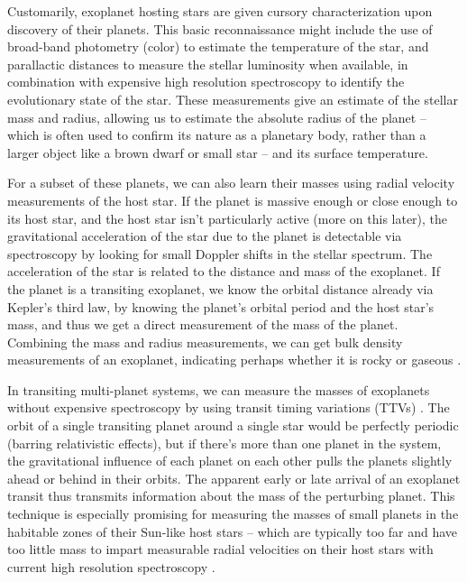 Customarily, exoplanet hosting stars are given cursory characterization upon discovery of their planets. This basic reconnaissance might include the use of broad-band photometry (color) to estimate the temperature of the star, and parallactic distances to measure the stellar luminosity when available, in combination with expensive high resolution spectroscopy to identify the evolutionary state of the star. These measurements give an estimate of the stellar mass and radius, allowing us to estimate the absolute radius of the planet -- which is often used to confirm its nature as a planetary body, rather than a larger object like a brown dwarf or small star -- and its surface temperature. 

For a subset of these planets, we can also learn their masses using radial velocity measurements of the host star. If the planet is massive enough or close enough to its host star, and the host star isn't particularly active (more on this later), the gravitational acceleration of the star due to the planet is detectable via spectroscopy by looking for small Doppler shifts in the stellar spectrum. The acceleration of the star is related to the distance and mass of the exoplanet. If the planet is a transiting exoplanet, we know the orbital distance already via Kepler's third law, by knowing the planet's orbital period and the host star's mass, and thus we get a direct measurement of the mass of the planet. Combining the mass and radius measurements, we can get bulk density measurements of an exoplanet, indicating perhaps whether it is rocky or gaseous \citep{Seager2007}. 

In transiting multi-planet systems, we can measure the masses of exoplanets without expensive spectroscopy by using transit timing variations (TTVs) \citep{Agol2005,Holman2005}. The orbit of a single transiting planet around a single star would be perfectly periodic (barring relativistic effects), but if there's more than one planet in the system, the gravitational influence of each planet on each other pulls the planets slightly ahead or behind in their orbits. The apparent early or late arrival of an exoplanet transit thus transmits information about the mass of the perturbing planet. This technique is especially promising for measuring the masses of small planets in the habitable zones of their Sun-like host stars -- which are typically too far and have too little mass to impart measurable radial velocities on their host stars with current high resolution spectroscopy \citep{Kasting1993}. 

